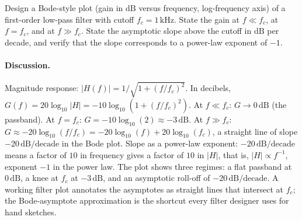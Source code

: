 \begin{exercise}
Design a Bode-style plot (gain in $\si{\deci\bel}$ versus frequency,
log-frequency axis) of a first-order low-pass filter with cutoff
$f_{c} = 1 \,\si{\kilo\hertz}$. State the gain at $f \ll f_{c}$, at
$f = f_{c}$, and at $f \gg f_{c}$. State the asymptotic slope above
the cutoff in $\si{\deci\bel}$ per decade, and verify that the
slope corresponds to a power-law exponent of $-1$.

\paragraph{Discussion.}
Magnitude response: $|H(f)| = 1/\sqrt{1 + (f/f_{c})^{2}}$. In
decibels, $G(f) = 20 \log_{10}|H| = -10 \log_{10}(1 + (f/f_{c})^{2})$.
At $f \ll f_{c}$: $G \to 0\,\si{\deci\bel}$ (the passband).
At $f = f_{c}$: $G = -10 \log_{10}(2) \approx -3\,\si{\deci\bel}$.
At $f \gg f_{c}$: $G \approx -20 \log_{10}(f/f_{c}) = -20
\log_{10}(f) + 20 \log_{10}(f_{c})$, a straight line of slope
$-20\,\si{\deci\bel}/\text{decade}$ in the Bode plot.
Slope as a power-law exponent: $-20\,\si{\deci\bel}/\text{decade}$
means a factor of $10$ in frequency gives a factor of $10$ in
$|H|$, that is, $|H| \propto f^{-1}$, exponent $-1$ in the power
law. The plot shows three regimes: a flat passband at $0\,\si
{\deci\bel}$, a knee at $f_{c}$ at $-3\,\si{\deci\bel}$, and an
asymptotic roll-off of $-20\,\si{\deci\bel}/\text{decade}$. A
working filter plot annotates the asymptotes as straight lines
that intersect at $f_{c}$; the Bode-asymptote approximation is the
shortcut every filter designer uses for hand sketches.
\end{exercise}

